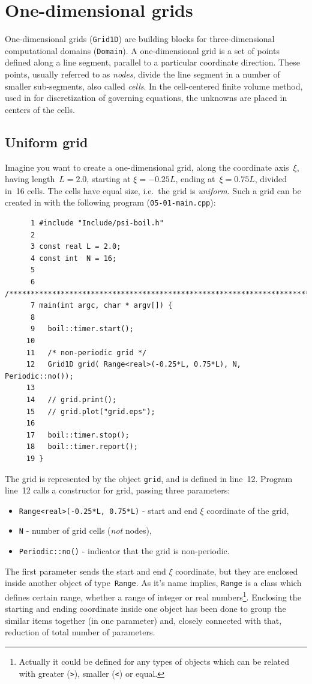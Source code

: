 \section{One-dimensional grids}
\label{sec_one-dimensional}

One-dimensional grids ({\tt Grid1D}) are building blocks for three-dimensional 
computational domains ({\tt Domain}). A one-dimensional grid is a set of
points defined along a line segment, parallel to a particular coordinate 
direction. These points, usually referred to as {\em nodes}, divide the line 
segment in a number of smaller sub-segments, also called {\em cells}.
%
In the cell-centered finite volume method, used in {\psiboil} for 
discretization of governing equations, the unknowns are placed in centers
of the cells. 

\subsection{Uniform grid}
\label{sub_sec_uniform}

Imagine you want to create a one-dimensional grid, along the coordinate
axis~$\xi$, having length~$L=2.0$, starting at $\xi=-0.25 L$, ending 
at~$\xi=0.75 L$, divided in~16 cells. The cells have equal size, 
i.e.\ the grid is {\em uniform}. Such a grid can be created in {\psiboil}
with the following program ({\tt 05-01-main.cpp}):
%
{\small \begin{verbatim}
      1 #include "Include/psi-boil.h"
      2
      3 const real L = 2.0;
      4 const int  N = 16;
      5
      6 /****************************************************************************/
      7 main(int argc, char * argv[]) {
      8
      9   boil::timer.start();
     10
     11   /* non-periodic grid */
     12   Grid1D grid( Range<real>(-0.25*L, 0.75*L), N, Periodic::no());
     13
     14   // grid.print();
     15   // grid.plot("grid.eps");
     16
     17   boil::timer.stop();
     18   boil::timer.report();
     19 }
\end{verbatim}}
%
The grid is represented by the object {\tt grid}, and is defined in line~12. 
Program line~12 calls a constructor for grid, passing three parameters:
%
\begin{itemize}
  \item {\tt Range<real>(-0.25*L, 0.75*L)} - start and end $\xi$ coordinate of the grid,
  \item {\tt N}                            - number of grid cells ({\em not} nodes),
  \item {\tt Periodic::no()}               - indicator that the grid is non-periodic.
\end{itemize}
%
The first parameter sends the start and end $\xi$ coordinate, but they are
enclosed inside another object of type~{\tt Range}. As it's name implies,
{\tt Range} is a class which defines certain range, whether a range of
integer or real numbers\footnote{Actually it could be defined for any types
of objects which can be related with greater ({\tt >}), smaller ({\tt <})
or equal.}. Enclosing the starting and ending coordinate inside one object has
been done to group the similar items together (in one parameter) and, closely
connected with that, reduction of total number of parameters. 

